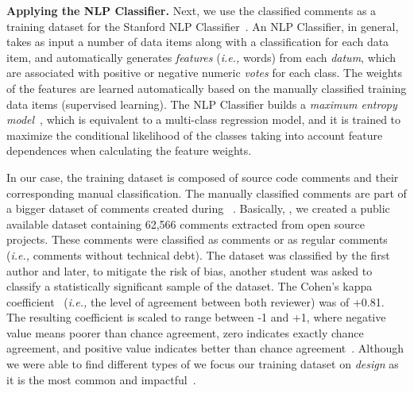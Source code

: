 \noindent\textbf{Applying the NLP Classifier.} Next, we use the classified \SATD comments as a training dataset for the Stanford NLP Classifier~\cite{Manning2014ACL}.
An NLP Classifier, in general, takes as input a number of data items along with a classification for each data item, and automatically generates \textit{features} (\textit{i.e.,} words) from each \textit{datum}, which are associated with positive or negative numeric \textit{votes} for each class. The weights of the features are learned automatically based on the manually classified training data items (supervised learning). The NLP Classifier builds a \textit{maximum entropy model}~\cite{nigam1999using}, which is equivalent to a multi-class regression model, and it is trained to maximize the conditional likelihood of the classes taking into account feature dependences when calculating the feature weights.

In our case, the training dataset is composed of source code comments and their corresponding manual classification. The manually classified comments are part of a bigger dataset of \SATD comments created during ~\cite{Maldonado2015MTD,Maldonado2015TSE}. Basically, , we created a public available dataset containing 62,566 comments extracted from  open source projects. These comments were classified as \SATD comments or as regular comments (\textit{i.e.,} comments without technical debt). The dataset was classified by the first author and later, to mitigate the risk of bias, another student was asked to classify a statistically significant sample of the dataset. The Cohen's kappa coefficient~\cite{cohen1960coefficient} (\textit{i.e.,} the level of agreement between both reviewer) was of +0.81. The resulting coefficient is scaled to range between -1 and +1, where negative value means poorer than chance agreement, zero indicates exactly chance agreement, and positive value indicates better than chance agreement~\cite{fleiss1973equivalence}. Although we were able to find different types of \SATD {} we focus our training dataset on \emph{design \SATD} as it is the most common and impactful~\cite{Ernst2015FSE}. 

